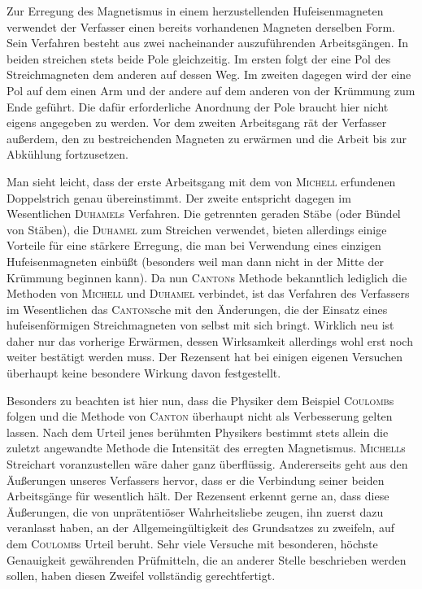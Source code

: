 Zur Erregung des Magnetismus in einem herzustellenden Hufeisenmagneten verwendet der Verfasser einen bereits vorhandenen Magneten derselben Form. Sein Verfahren besteht aus zwei nacheinander auszuführenden Arbeitsgängen. In beiden streichen stets beide Pole gleichzeitig. Im ersten folgt der eine Pol des Streichmagneten dem anderen auf dessen Weg. Im zweiten dagegen wird der eine Pol auf dem einen Arm und der andere auf dem anderen von der Krümmung zum Ende geführt. Die dafür erforderliche Anordnung der Pole braucht hier nicht eigens angegeben zu werden. Vor dem zweiten Arbeitsgang rät der Verfasser außerdem, den zu bestreichenden Magneten zu erwärmen und die Arbeit bis zur Abkühlung fortzusetzen.

Man sieht leicht, dass der erste Arbeitsgang mit dem von \textsc{Michell} erfundenen Doppelstrich genau übereinstimmt. Der zweite entspricht dagegen im Wesentlichen \textsc{Duhamel}s Verfahren. Die getrennten geraden Stäbe (oder Bündel von Stäben), die \textsc{Duhamel} zum Streichen verwendet, bieten allerdings einige Vorteile für eine stärkere Erregung, die man bei Verwendung eines einzigen Hufeisenmagneten einbüßt (besonders weil man dann nicht in der Mitte der Krümmung beginnen kann). Da nun \textsc{Canton}s Methode bekanntlich lediglich die Methoden von \textsc{Michell} und \textsc{Duhamel} verbindet, ist das Verfahren des Verfassers im Wesentlichen das \textsc{Canton}sche mit den Änderungen, die der Einsatz eines hufeisenförmigen Streichmagneten von selbst mit sich bringt. Wirklich neu ist daher nur das vorherige Erwärmen, dessen Wirksamkeit allerdings wohl erst noch weiter bestätigt werden muss. Der Rezensent hat bei einigen eigenen Versuchen überhaupt keine besondere Wirkung davon festgestellt.

Besonders zu beachten ist hier nun, dass die Physiker dem Beispiel \textsc{Coulomb}s folgen und die Methode von \textsc{Canton} überhaupt nicht als Verbesserung gelten lassen. Nach dem Urteil jenes berühmten Physikers bestimmt stets allein die zuletzt angewandte Methode die Intensität des erregten Magnetismus. \textsc{Michell}s Streichart voranzustellen wäre daher ganz überflüssig. Andererseits geht aus den Äußerungen unseres Verfassers hervor, dass er die Verbindung seiner beiden Arbeitsgänge für wesentlich hält. Der Rezensent erkennt gerne an, dass diese Äußerungen, die von unprätentiöser Wahrheitsliebe zeugen, ihn zuerst dazu veranlasst haben, an der Allgemeingültigkeit des Grundsatzes zu zweifeln, auf dem \textsc{Coulomb}s Urteil beruht. Sehr viele Versuche mit besonderen, höchste Genauigkeit gewährenden Prüfmitteln, die an anderer Stelle beschrieben werden sollen, haben diesen Zweifel vollständig gerechtfertigt.

